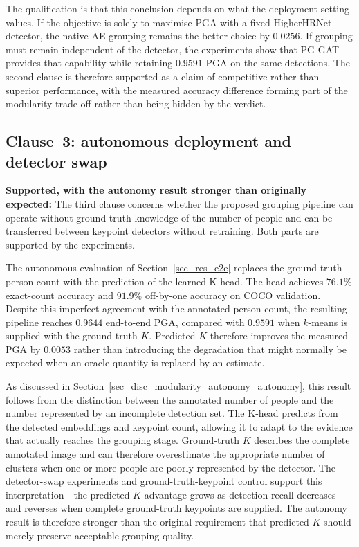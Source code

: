 The qualification is that this conclusion depends on what the deployment
setting values.
If the objective is solely to maximise PGA with a fixed HigherHRNet
detector, the native AE grouping remains the better choice by $0.0256$.
If grouping must remain independent of the detector,
the experiments show that PG-GAT provides that capability while
retaining $0.9591$ PGA on the same detections.
The second clause is therefore supported as a claim of competitive
rather than superior performance,
with the measured accuracy difference forming part of the modularity
trade-off rather than being hidden by the verdict.

\subsection{Clause~3: autonomous deployment and detector swap}
\label{sec_conc_verdict_autonomy}

\textbf{Supported, with the autonomy result stronger than originally expected:}
The third clause concerns whether the proposed grouping pipeline can
operate without ground-truth knowledge of the number of people and can
be transferred between keypoint detectors without retraining.
Both parts are supported by the experiments.

The autonomous evaluation of Section~\ref{sec_res_e2e} replaces the
ground-truth person count with the prediction of the learned K-head.
The head achieves $76.1\%$ exact-count accuracy and $91.9\%$ off-by-one
accuracy on COCO validation.
Despite this imperfect agreement with the annotated person count,
the resulting pipeline reaches $0.9644$ end-to-end PGA,
compared with $0.9591$ when $k$-means is supplied with the ground-truth
$K$.
Predicted $K$ therefore improves the measured PGA by $0.0053$ rather
than introducing the degradation that might normally be expected when an
oracle quantity is replaced by an estimate.

As discussed in Section~\ref{sec_disc_modularity_autonomy_autonomy},
this result follows from the distinction between the annotated number of
people and the number represented by an incomplete detection set.
The K-head predicts from the detected embeddings and keypoint count,
allowing it to adapt to the evidence that actually reaches the grouping
stage.
Ground-truth $K$ describes the complete annotated image and can
therefore overestimate the appropriate number of clusters when one or
more people are poorly represented by the detector.
The detector-swap experiments and ground-truth-keypoint control support
this interpretation -
the predicted-$K$ advantage grows as detection recall decreases and
reverses when complete ground-truth keypoints are supplied.
The autonomy result is therefore stronger than the original requirement
that predicted $K$ should merely preserve acceptable grouping quality.

